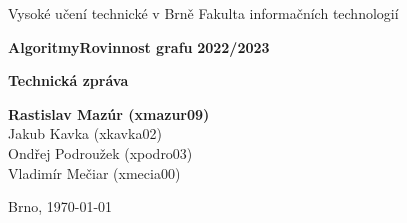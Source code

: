 \documentclass[12pt,a4paper]{article}
\begin{document}
    \pagestyle{empty}
    \begin{titlepage}
        \begin{center}
            \normalsize{Vysoké učení technické v Brně\linebreak}
            \normalsize{Fakulta informačních technologií}

            \vfill

            \large\textbf{Algoritmy\linebreak Rovinnost grafu}
            \large\textbf{2022/2023}

            \vfill

            \LARGE\textbf{Technická zpráva\linebreak}

            \vfill
            \vfill
            \vfill


            \begin{flushleft}
                \large
                \textbf{Rastislav Mazúr  (xmazur09)}\\
                Jakub Kavka (xkavka02)\\
                Ondřej Podroužek (xpodro03)\\
                Vladimír Mečiar (xmecia00)\\
                \hfill

                Brno, \today
            \end{flushleft}
        \end{center}
    \end{titlepage}
    \pagestyle{plain}
    \newpage

    \tableofcontents
    \newpage


    
\end{document}
